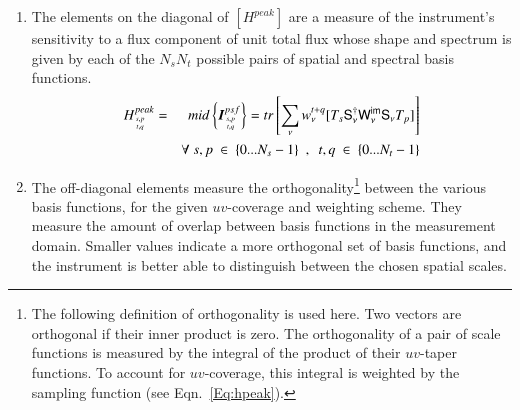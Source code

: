 \documentclass[structabstract]{stylefiles/aa}
\newcommand{\Sna}{\tens{{S_{\nu}}}}
\newcommand{\Snd}{\tens{{S_{\nu}^\dag}}}
\newcommand{\Wimn}{{\tens{W^{im}_{\nu}}}}
\newcommand{\wntq}{{w_{\nu}^{t+q}}}
\begin{document}
\begin{enumerate}
\item The elements on the diagonal of $[H^{peak}]$ are a measure of the instrument's sensitivity 
to a flux component of unit total flux whose shape and spectrum is given by each of the $N_sN_t$
possible pairs of spatial and spectral basis functions.
\begin{eqnarray}
H^{peak}_{{s,p}\atop{t,q}} &=& mid\left\{\vec{I}^{psf}_{{s,p}\atop{t,q}}\right\} = tr\left[\sum_{\nu} \wntq [T_s\Snd\Wimn\Sna T_p] \right] \\
	& &\forall~ s,p ~\in ~\{0 ... N_s-1\}~~,~~t,q ~\in ~\{0 ... N_t-1\}\nonumber
\label{Eq:hpeak_msmfs}
\end{eqnarray}
\item The off-diagonal elements measure the orthogonality\footnote
{\label{FN:ortho}The following definition of orthogonality is used here. Two vectors are orthogonal
if their inner product is zero. The orthogonality of a pair of scale functions 
is measured by the integral of the product of their $uv$-taper functions.
To account for $uv$-coverage, this integral is weighted by the sampling function
(see Eqn.~\ref{Eq:hpeak}).
}
 between the various
basis functions, for the given $uv$-coverage and weighting scheme.
They measure the amount of overlap between basis
functions in the measurement domain. 
Smaller values indicate a more orthogonal set of basis functions,
and the instrument is better able to distinguish between the chosen spatial scales.


\end{enumerate}
\end{document}
